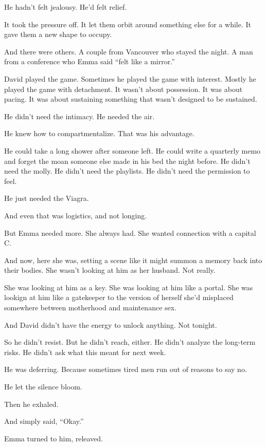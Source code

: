 He hadn’t felt jealousy.
He’d felt relief.

It took the pressure off.
It let them orbit around something else for a while.
It gave them a new shape to occupy.

And there were others.
A couple from Vancouver who stayed the night.
A man from a conference who Emma said ``felt like a mirror.''

David played the game.
Sometimes he played the game with interest.
Mostly he played the game with detachment.
It wasn’t about possession.
It was about pacing.
It was about sustaining something that wasn’t designed to be sustained.

He didn’t need the intimacy.
He needed the air.

He knew how to compartmentalize.
That was his advantage.

He could take a long shower after someone left.
He could write a quarterly memo and forget the moan someone else made in his bed the night before.
He didn’t need the molly.
He didn’t need the playlists.
He didn’t need the permission to feel.

He just needed the Viagra.

And even that was logistics, and not longing.

But Emma needed more.
She always had.
She wanted connection with a capital C.

And now, here she was, setting a scene like it might summon a memory back into their bodies.
She wasn’t looking at him as her husband.
Not really.

She was looking at him as a key.
She was looking at him like a portal.
She was lookign at him like a gatekeeper to the version of herself she’d misplaced 
somewhere between motherhood and maintenance sex.

And David didn’t have the energy to unlock anything.
Not tonight.

So he didn’t resist.
But he didn’t reach, either.
He didn’t analyze the long-term risks.
He didn’t ask what this meant for next week.

He was deferring.
Because sometimes tired men run out of reasons to say no.

He let the silence bloom.

Then he exhaled.

And simply said, “Okay.”





Emma turned to him, releaved.

